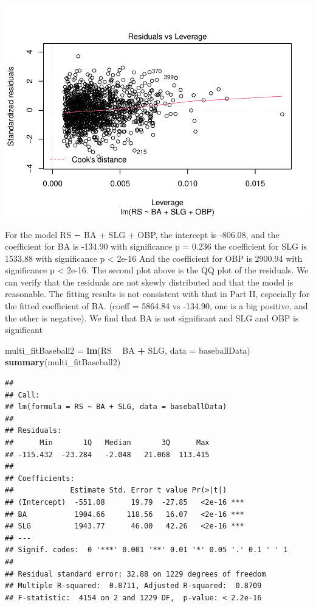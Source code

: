 \documentclass[
]{article}
\newenvironment{Shaded}{\begin{snugshade}}{\end{snugshade}}
\newcommand{\DataTypeTok}[1]{\textcolor[rgb]{0.13,0.29,0.53}{#1}}
\newcommand{\KeywordTok}[1]{\textcolor[rgb]{0.13,0.29,0.53}{\textbf{#1}}}
\newcommand{\NormalTok}[1]{#1}
\newcommand{\OperatorTok}[1]{\textcolor[rgb]{0.81,0.36,0.00}{\textbf{#1}}}
\newcommand{\StringTok}[1]{\textcolor[rgb]{0.31,0.60,0.02}{#1}}
\begin{document}
\includegraphics{HW2_Liu-Zi-Jian_files/figure-latex/unnamed-chunk-39-4.pdf}

For the model RS ∼ BA + SLG + OBP, the intercept is -806.08, and the
coefficient for BA is -134.90 with significance p = 0.236 the
coefficient for SLG is 1533.88 with significance p \textless{} 2e-16 And
the coefficient for OBP is 2900.94 with significance p \textless{}
2e-16. The second plot above is the QQ plot of the residuals. We can
verify that the residuals are not skewly distributed and that the model
is reasonable. The fitting results is not consistent with that in Part
II, especially for the fitted coefficient of BA. (coeff = 5864.84 vs
-134.90, one is a big positive, and the other is negative). We find that
BA is not significant and SLG and OBP is significant

\begin{Shaded}
\begin{Highlighting}[]
\NormalTok{multi_fitBaseball2 =}\StringTok{ }\KeywordTok{lm}\NormalTok{(RS }\OperatorTok{~}\StringTok{ }\NormalTok{BA }\OperatorTok{+}\StringTok{ }\NormalTok{SLG, }\DataTypeTok{data =}\NormalTok{ baseballData)}
\KeywordTok{summary}\NormalTok{(multi_fitBaseball2)}
\end{Highlighting}
\end{Shaded}

\begin{verbatim}
## 
## Call:
## lm(formula = RS ~ BA + SLG, data = baseballData)
## 
## Residuals:
##      Min       1Q   Median       3Q      Max 
## -115.432  -23.284   -2.048   21.068  113.415 
## 
## Coefficients:
##             Estimate Std. Error t value Pr(>|t|)    
## (Intercept)  -551.08      19.79  -27.85   <2e-16 ***
## BA           1904.66     118.56   16.07   <2e-16 ***
## SLG          1943.77      46.00   42.26   <2e-16 ***
## ---
## Signif. codes:  0 '***' 0.001 '**' 0.01 '*' 0.05 '.' 0.1 ' ' 1
## 
## Residual standard error: 32.88 on 1229 degrees of freedom
## Multiple R-squared:  0.8711, Adjusted R-squared:  0.8709 
## F-statistic:  4154 on 2 and 1229 DF,  p-value: < 2.2e-16
\end{verbatim}
\end{document}
